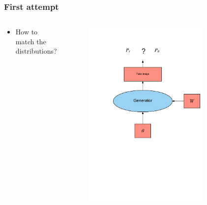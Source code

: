 \documentclass{Bredelebeamer}
\begin{document}
\begin{frame}
\frametitle{First attempt}
\begin{columns}
\begin{column}{0.5\textwidth}
\begin{itemize}
	\item How to match the distributions?
\end{itemize}
\end{column}
\begin{column}{0.5\textwidth}  %
\begin{figure}[h!]
	\centering
	\includegraphics[width=0.8\textwidth]{first_attempt_gan.png}
\end{figure}
\end{column}
\end{columns}


\end{frame}

\end{document}
